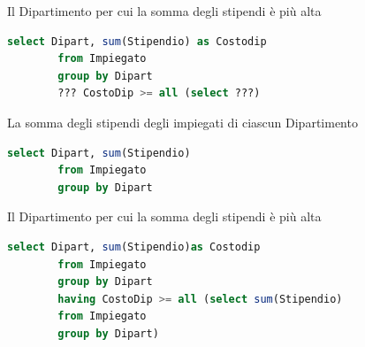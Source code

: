 \documentclass{article}
\begin{document}
	Il Dipartimento per cui la somma degli stipendi è più alta
	\begin{lstlisting}[language=SQL]
		select Dipart, sum(Stipendio) as Costodip
		from Impiegato
		group by Dipart
		??? CostoDip >= all (select ???)
	\end{lstlisting}
	La somma degli stipendi degli impiegati di ciascun Dipartimento
	\begin{lstlisting}[language=SQL]
		select Dipart, sum(Stipendio)
		from Impiegato
		group by Dipart
	\end{lstlisting}
	Il Dipartimento per cui la somma degli stipendi è più alta
	\begin{lstlisting}[language=SQL]
		select Dipart, sum(Stipendio)as Costodip
		from Impiegato
		group by Dipart
		having CostoDip >= all (select sum(Stipendio)
		from Impiegato
		group by Dipart)
	\end{lstlisting}
\end{document}
